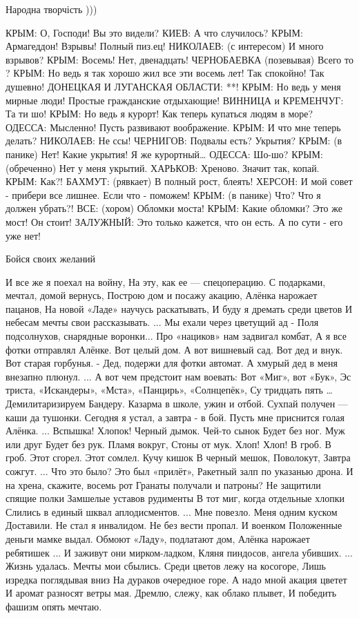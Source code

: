 Народна творчість )))

\obeycr
КРЫМ: О, Господи! Вы это видели?
КИЕВ: А что случилось?
КРЫМ: Армагеддон! Взрывы! Полный пиз.ец!
НИКОЛАЕВ: (с интересом) И много взрывов?
КРЫМ: Восемь! Нет, двенадцать!
ЧЕРНОБАЕВКА (позевывая) Всего то ?
КРЫМ: Но ведь я так хорошо жил все эти восемь лет! Так спокойно! Так душевно!
ДОНЕЦКАЯ И ЛУГАНСКАЯ ОБЛАСТИ: **!
КРЫМ: Но ведь у меня мирные люди! Простые гражданские отдыхающие!
ВИННИЦА и КРЕМЕНЧУГ: Та ти шо!
КРЫМ: Но ведь я курорт! Как теперь купаться людям в море?
ОДЕССА: Мысленно! Пусть развивают воображение.
КРЫМ: И что мне теперь делать?
НИКОЛАЕВ: Не ссы!
ЧЕРНИГОВ: Подвалы есть? Укрытия?
КРЫМ: (в панике) Нет! Какие укрытия! Я же курортный…
ОДЕССА: Шо-шо?
КРЫМ: (обреченно) Нет у меня укрытий.
ХАРЬКОВ: Хреново. Значит так, копай.
КРЫМ: Как?!
БАХМУТ: (рявкает) В полный рост, блеять!
ХЕРСОН: И мой совет - прибери все лишнее. Если что - поможем!
КРЫМ: (в панике) Что? Что я должен убрать?!
ВСЕ: (хором) Обломки моста!
КРЫМ: Какие обломки? Это же мост! Он стоит!
ЗАЛУЖНЫЙ: Это только кажется, что он есть. А по сути - его уже нет!
\restorecr

Бойся своих желаний

И все же я поехал на войну,
На эту, как ее — спецоперацию.
С подарками, мечтал, домой вернусь,
Построю дом и посажу акацию,
Алёнка нарожает пацанов,
На новой «Ладе» научусь раскатывать,
И буду я дремать среди цветов
И небесам мечты свои рассказывать.
...
Мы ехали через цветущий ад -
Поля подсолнухов, снарядные воронки...
Про «нациков» нам задвигал комбат,
А я все фотки отправлял Алёнке.
Вот целый дом. А вот вишневый сад.
Вот дед и внук. Вот старая горбунья.
- Дед, подержи для фотки автомат.
А хмурый дед в меня внезапно плюнул.
...
А вот чем предстоит нам воевать:
Вот «Миг», вот «Бук», Эс триста, «Искандеры»,
«Мста», «Панцирь», «Солнцепёк», Су тридцать пять …
Демилитаризируем Бандеру.
Казарма в школе, ужин и отбой.
Сухпай получен — каши да тушонки.
Сегодня я устал, а завтра - в бой.
Пусть мне приснится голая Алёнка.
...
Вспышка! Хлопок!
Черный дымок.
Чей-то сынок
Будет без ног.
Муж или друг
Будет без рук.
Пламя вокруг,
Стоны от мук.
Хлоп! Хлоп!
В гроб. В гроб.
Этот сгорел.
Этот сомлел.
Кучу кишок
В черный мешок,
Поволокут,
Завтра сожгут.
...
Что это было? Это был «прилёт»,
Ракетный залп по указанью дрона.
И на хрена, скажите, восемь рот
Гранаты получали и патроны?
Не защитили спящие полки
Замшелые уставов рудименты
В тот миг, когда отдельные хлопки
Слились в единый шквал аплодисментов.
...
Мне повезло. Меня одним куском
Доставили. Не стал я инвалидом.
Не без вести пропал. И военком
Положенные деньги мамке выдал.
Обмоют «Ладу», подлатают дом,
Алёнка нарожает ребятишек ...
И заживут они мирком-ладком,
Кляня пиндосов, ангела убивших.
...
Жизнь удалась. Мечты мои сбылись.
Среди цветов лежу на косогоре,
Лишь изредка поглядывая вниз
На дураков очередное горе.
А надо мной акация цветет
И аромат разносят ветры мая.
Дремлю, слежу, как облако плывет,
И победить фашизм опять мечтаю.
